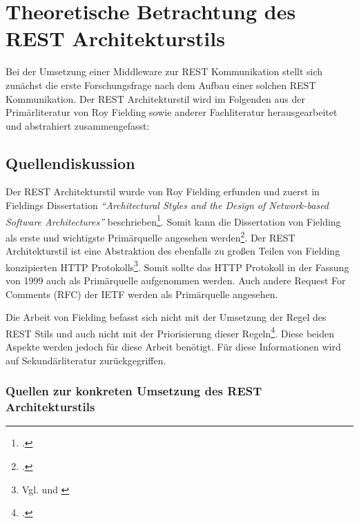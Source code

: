 \chapter{Theoretische Betrachtung des REST Architekturstils}\label{chapter:theoretische-betrachtung}

Bei der Umsetzung einer Middleware zur REST Kommunikation stellt sich zunächst die erste Forschungsfrage nach dem Aufbau einer solchen REST Kommunikation. Der REST Architekturstil wird im Folgenden aus der Primärliteratur von Roy Fielding sowie anderer Fachliteratur herausgearbeitet und abstrahiert zusammengefasst:

\section{Quellendiskussion}\label{section:quellendiskussion}

Der REST Architekturstil wurde von Roy Fielding erfunden und zuerst in Fieldings Dissertation \emph{“Architectural Styles and the Design of Network-based Software Architectures”} beschrieben\footcite[Vgl. ][S. 1]{tilkov_rest_2015}. Somit kann die Dissertation von Fielding als erste und wichtigste Primärquelle angesehen werden\footcite[Vgl. ][S. XVI]{richardson_restful_2007}. Der REST Architekturstil ist eine Abstraktion des ebenfalls zu großen Teilen von Fielding konzipierten HTTP Protokolls\footnote{Vgl. \cite[S. 1]{tilkov_rest_2015} und \cite[S. XVII]{richardson_restful_2007}}. Somit sollte das HTTP Protokoll in der Fassung von 1999 auch als Primärquelle aufgenommen werden. Auch andere Request For Comments (RFC) der IETF werden als Primärquelle angesehen. 

Die Arbeit von Fielding befasst sich nicht mit der Umsetzung der Regel des REST Stils und auch nicht mit der Priorisierung dieser Regeln\footcite[Vgl. ][S. XVI]{richardson_restful_2007}. Diese beiden Aspekte werden jedoch für diese Arbeit benötigt. Für diese Informationen wird auf Sekundärliteratur zurückgegriffen. 

\subsection{Quellen zur konkreten Umsetzung des REST Architekturstils}\label{subsection:qullen-zur-konkreten-umsetzung}


